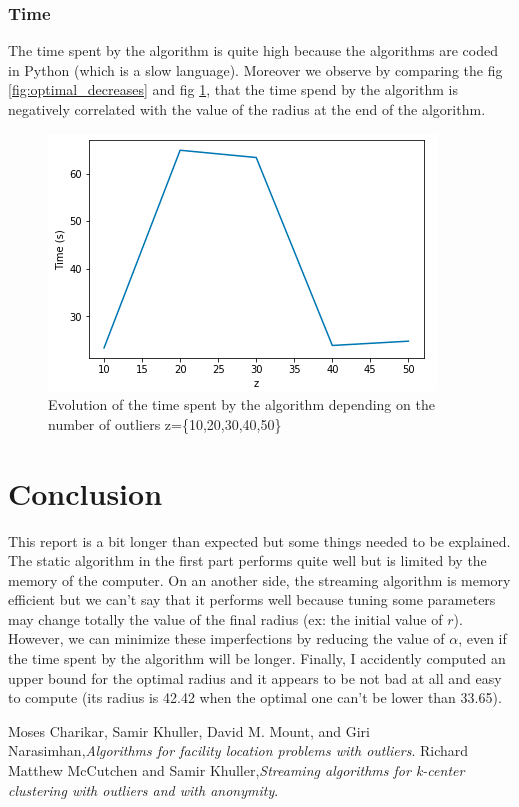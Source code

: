 \documentclass[a4paper,11pt,openany]{article}
\begin{document}
\subsubsection{Time}
\noindent
The time spent by the algorithm is quite high because the algorithms are coded in Python (which is a slow language). Moreover we observe by comparing the fig \ref{fig:optimal_decreases} and fig \ref{fig:time}, that the time spend by the algorithm is negatively correlated with the value of the radius at the end of the algorithm.
\begin{figure}[H]
\begin{center}
\includegraphics[scale=0.7]{Images/time}
\caption{Evolution of the time spent by the algorithm depending on the number of outliers z=\{10,20,30,40,50\}}
\label{fig:time}
\end{center}
\end{figure}

\section*{Conclusion}
\noindent
This report is a bit longer than expected but some things needed to be explained. The static algorithm in the first part performs quite well but is limited by the memory of the computer. On an another side, the streaming algorithm is memory efficient but we can't say that it performs well because tuning some parameters may change totally the value of the final radius (ex: the initial value of $r$). However, we can minimize these imperfections by reducing the value of $\alpha$, even if the time spent by the algorithm will be longer. Finally, I accidently computed an upper bound for the optimal radius and it appears to be not bad at all and easy to compute (its radius is 42.42 when the optimal one can't be lower than 33.65).

\begin{thebibliography}{999}

Moses Charikar, Samir Khuller, David M. Mount, and Giri Narasimhan,\emph{Algorithms for facility location problems with outliers}. 
Richard Matthew McCutchen and Samir Khuller,\emph{Streaming algorithms for k-center clustering with outliers and with anonymity}. 

\end{thebibliography}
\end{document}
